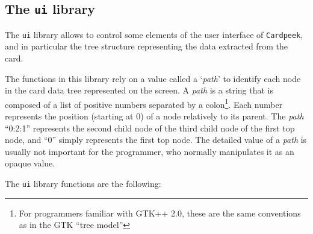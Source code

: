 \documentclass[11pt]{article}
\begin{document}
\subsection{The \texttt{ui} library}

The \texttt{ui} library allows to control some elements of the user interface of 
\texttt{Cardpeek}, and in particular the tree structure representing the data 
extracted from the card.

The functions in this library rely on a value called a `\emph{path}' to identify 
each node in the card data tree represented on the screen.
A \emph{path} is a string that is composed of a list of positive numbers separated 
by a colon\footnote{For programmers familiar with GTK++ 2.0, these are the same 
conventions as in the GTK ``tree model''}. 
Each number represents the position (starting at 0) of a node relatively to its parent.
The \emph{path} ``0:2:1'' represents the second child node of the third child 
node of the first top node, and ``0'' simply represents the first top node.
The detailed value of a \emph{path} is usually not important for the programmer, 
who normally manipulates it as an opaque value. 

The \texttt{ui} library functions are the following:
\end{document}
